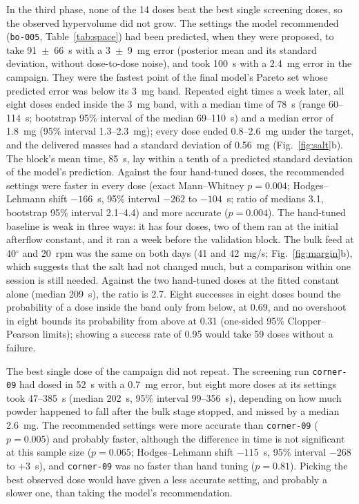 \documentclass[preprint,12pt]{elsarticle}
\begin{document}
In the third phase, none of the 14 doses beat the best single screening doses, so the observed hypervolume did not grow. The settings the model recommended (\texttt{bo-005}, Table~\ref{tab:space}) had been predicted, when they were proposed, to take 91~$\pm$~66~s with a 3~$\pm$~9~mg error (posterior mean and its standard deviation, without dose-to-dose noise), and took 100~s with a 2.4~mg error in the campaign. They were the fastest point of the final model's Pareto set whose predicted error was below its 3~mg band. Repeated eight times a week later, all eight doses ended inside the 3~mg band, with a median time of 78~s (range 60--114~s; bootstrap 95\% interval of the median 69--110~s) and a median error of 1.8~mg (95\% interval 1.3--2.3~mg); every dose ended 0.8--2.6~mg under the target, and the delivered masses had a standard deviation of 0.56~mg (Fig.~\ref{fig:salt}b). The block's mean time, 85~s, lay within a tenth of a predicted standard deviation of the model's prediction. Against the four hand-tuned doses, the recommended settings were faster in every dose (exact Mann--Whitney $p = 0.004$; Hodges--Lehmann shift $-166$~s, 95\% interval $-262$ to $-104$~s; ratio of medians 3.1, bootstrap 95\% interval 2.1--4.4) and more accurate ($p = 0.004$). The hand-tuned baseline is weak in three ways: it has four doses, two of them ran at the initial afterflow constant, and it ran a week before the validation block. The bulk feed at 40$^\circ$ and 20~rpm was the same on both days (41 and 42~mg/s; Fig.~\ref{fig:margin}b), which suggests that the salt had not changed much, but a comparison within one session is still needed. Against the two hand-tuned doses at the fitted constant alone (median 209~s), the ratio is 2.7. Eight successes in eight doses bound the probability of a dose inside the band only from below, at 0.69, and no overshoot in eight bounds its probability from above at 0.31 (one-sided 95\% Clopper--Pearson limits); showing a success rate of 0.95 would take 59 doses without a failure.

The best single dose of the campaign did not repeat. The screening run \texttt{corner-09} had dosed in 52~s with a 0.7~mg error, but eight more doses at its settings took 47--385~s (median 202~s, 95\% interval 99--356~s), depending on how much powder happened to fall after the bulk stage stopped, and missed by a median 2.6~mg. The recommended settings were more accurate than \texttt{corner-09} ($p = 0.005$) and probably faster, although the difference in time is not significant at this sample size ($p = 0.065$; Hodges--Lehmann shift $-115$~s, 95\% interval $-268$ to $+3$~s), and \texttt{corner-09} was no faster than hand tuning ($p = 0.81$). Picking the best observed dose would have given a less accurate setting, and probably a slower one, than taking the model's recommendation.
\end{document}
